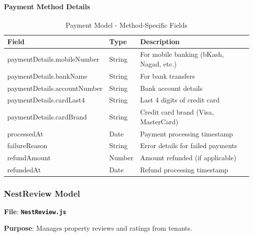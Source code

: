 \documentclass[12pt,a4paper]{article}
\newcommand{\file}[1]{\textbf{\texttt{#1}}}
\begin{document}
\paragraph{Payment Method Details}
\begin{table}[H]
\centering
\small
\begin{tabular}{@{}lll@{}}
\toprule
\textbf{Field} & \textbf{Type} & \textbf{Description} \\
\midrule
paymentDetails.mobileNumber & String & For mobile banking (bKash, Nagad, etc.) \\
paymentDetails.bankName & String & For bank transfers \\
paymentDetails.accountNumber & String & Bank account details \\
paymentDetails.cardLast4 & String & Last 4 digits of credit card \\
paymentDetails.cardBrand & String & Credit card brand (Visa, MasterCard) \\
processedAt & Date & Payment processing timestamp \\
failureReason & String & Error details for failed payments \\
refundAmount & Number & Amount refunded (if applicable) \\
refundedAt & Date & Refund processing timestamp \\
\bottomrule
\end{tabular}
\caption{Payment Model - Method-Specific Fields}
\label{tab:payment-details-schema}
\end{table}

\subsubsection{NestReview Model}
\label{subsubsec:nestreview-model}

\textbf{File}: \file{NestReview.js}

\textbf{Purpose}: Manages property reviews and ratings from tenants.
\end{document}
